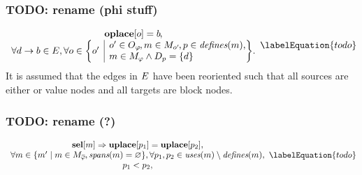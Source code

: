 \subsubsection{TODO: rename (phi stuff)}



\begin{equation}
  \begin{array}{c}
    \mVar{oplace}[o] = b \hspace{-.8pt}, \\
    \forall \mEdge{d}{b} \in \mDefEdgeSet,
    \forall o \in
      \mSetBuilder*{o'}%
                   {%
                     \begin{array}{@{}l@{}}
                       o' \in \mOpSet[\mPhi] \hspace{-1pt},
                       m \in \mMatchSet[o'] \hspace{-1pt},
                       p \in \mDefines(m), \\
                       m \in \mPhiMatchSet \mAnd \mDataSet[p] = \mSet{d}
                     \end{array}
                   } \!.
  \end{array}
  \labelEquation{todo}
\end{equation}
%
It is assumed that the \glspl{edge} in $E$ have been reoriented such
that all \glspl{source} are either  or \glspl{value node}
and all \glspl{target} are \glspl{block node}.


\subsubsection{TODO: rename (?)}



\begin{equation}
  \begin{array}{c}
    \mVar{sel}[m] \mImp \mVar{uplace}[p_1] = \mVar{uplace}[p_2], \\
    \forall m \in
      \mSetBuilder{m'}%
                  {%
                    m \in \mPhiMatchCompSet \hspace{-1pt},
                    \mSpans(m) = \mEmptySet
                  },
    \forall p_1, p_2 \in \mUses(m) \setminus \mDefines(m), \\
    p_1 < p_2,
  \end{array}
  \labelEquation{todo}
\end{equation}

